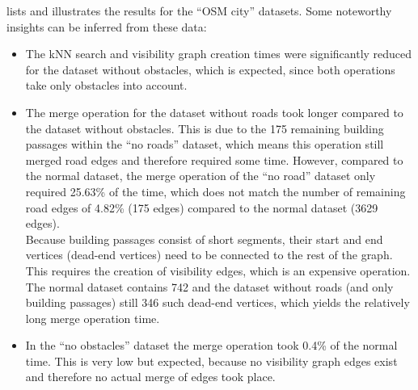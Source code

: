 			\noindent
			 lists and illustrates the results for the \enquote{OSM city} datasets.
			Some noteworthy insights can be inferred from these data:
			\begin{itemize}
				\item The kNN search and visibility graph creation times were significantly reduced for the dataset without obstacles, which is expected, since both operations take only obstacles into account.
				\item The merge operation for the dataset without roads took longer compared to the dataset without obstacles.
				This is due to the 175 remaining building passages within the \enquote{no roads} dataset, which means this operation still merged road edges and therefore required some time.
				However, compared to the normal dataset, the merge operation of the \enquote{no road} dataset only required 25.63\% of the time, which does not match the number of remaining road edges of 4.82\% (175 edges) compared to the normal dataset (3629 edges).\\
				Because building passages consist of short segments, their start and end vertices (dead-end vertices) need to be connected to the rest of the graph.
				This requires the creation of visibility edges, which is an expensive operation.
				The normal dataset contains 742 and the dataset without roads (and only building passages) still 346 such dead-end vertices, which yields the relatively long merge operation time.
				\item In the \enquote{no obstacles} dataset the merge operation took 0.4\% of the normal time. This is very low but expected, because no visibility graph edges exist and therefore no actual merge of edges took place.
			\end{itemize}
			
